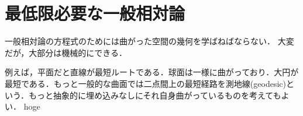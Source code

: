 \section{最低限必要な一般相対論}
一般相対論の方程式のためには曲がった空間の幾何を学ばねばならない．
大変だが，大部分は機械的にできる．

例えば，平面だと直線が最短ルートである．球面は一様に曲がっており．大円が最短である．もっと一般的な曲面では二点間上の最短経路を測地線(geodesic)という．もっと抽象的に埋め込みなしにそれ自身曲がっているものを考えてもよい．
hoge
